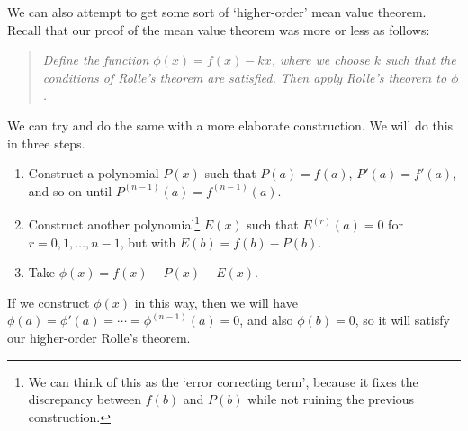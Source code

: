 We can also attempt to get some sort of `higher-order' mean value theorem. Recall that our proof of the mean value theorem was more or less as follows:
\begin{quotation}\noindent
	\emph{Define the function $\phi(x) = f(x) - kx$, where we choose $k$ such that the conditions of Rolle's theorem are satisfied.
	Then apply Rolle's theorem to $\phi$.}
\end{quotation}
We can try and do the same with a more elaborate construction. We will do this in three steps.
\begin{enumerate}
	\item Construct a polynomial $P(x)$ such that $P(a) = f(a)$, $P'(a) = f'(a)$, and so on until $P^{(n - 1)}(a) = f^{(n - 1)}(a)$.
	\item Construct another polynomial\footnote{We can think of this as the `error correcting term', because it fixes the discrepancy between $f(b)$ and $P(b)$ while not ruining the previous construction.} $E(x)$ such that $E^{(r)}(a) = 0$ for $r = 0, 1, \dots, n - 1$, but with $E(b) = f(b) - P(b)$.
	\item Take $\phi(x) = f(x) - P(x) - E(x)$.
\end{enumerate}
If we construct $\phi(x)$ in this way, then we will have $\phi(a) = \phi'(a) = \cdots = \phi^{(n - 1)}(a) = 0$, and also $\phi(b) = 0$, so it will satisfy our higher-order Rolle's theorem.

